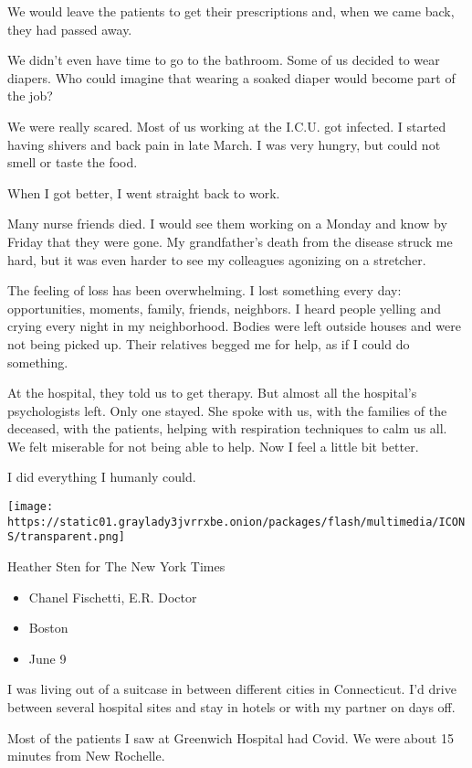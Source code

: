 We would leave the patients to get their prescriptions and, when we came
back, they had passed away.

We didn't even have time to go to the bathroom. Some of us decided to
wear diapers. Who could imagine that wearing a soaked diaper would
become part of the job?

We were really scared. Most of us working at the I.C.U. got infected. I
started having shivers and back pain in late March. I was very hungry,
but could not smell or taste the food.

When I got better, I went straight back to work.

Many nurse friends died. I would see them working on a Monday and know
by Friday that they were gone. My grandfather's death from the disease
struck me hard, but it was even harder to see my colleagues agonizing on
a stretcher.

The feeling of loss has been overwhelming. I lost something every day:
opportunities, moments, family, friends, neighbors. I heard people
yelling and crying every night in my neighborhood. Bodies were left
outside houses and were not being picked up. Their relatives begged me
for help, as if I could do something.

At the hospital, they told us to get therapy. But almost all the
hospital's psychologists left. Only one stayed. She spoke with us, with
the families of the deceased, with the patients, helping with
respiration techniques to calm us all. We felt miserable for not being
able to help. Now I feel a little bit better.

I did everything I humanly could.

\texttt{[image: https://static01.graylady3jvrrxbe.onion/packages/flash/multimedia/ICONS/transparent.png]}

Heather Sten for The New York Times

\begin{itemize}
\tightlist
\item
  Chanel Fischetti, E.R. Doctor
\item
  Boston
\item
  June 9
\end{itemize}

I was living out of a suitcase in between different cities in
Connecticut. I'd drive between several hospital sites and stay in hotels
or with my partner on days off.

Most of the patients I saw at Greenwich Hospital had Covid. We were
about 15 minutes from New Rochelle.

